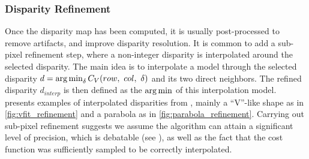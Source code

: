 \subsubsection{Disparity Refinement}\label{sec:postprocess_disparity}
Once the disparity map has been computed, it is usually post-processed to remove artifacts, and improve disparity resolution. It is common to add a sub-pixel refinement step, where a non-integer disparity is interpolated around the selected disparity. The main idea is to interpolate a model through the selected disparity $d=\operatorname*{arg\,min}_\delta C_V(row, ~col, ~\delta)$ and its two direct neighbors. The refined disparity $d_{interp}$ is then defined as the $\operatorname*{arg\,min}$ of this interpolation model.  presents examples of interpolated disparities from  \cite{haller_real-time_2010}, mainly a ``V''-like shape as in \ref{fig:vfit_refinement} and a parabola as in \ref{fig:parabola_refinement}. Carrying out sub-pixel refinement suggests we assume the algorithm can attain a significant level of precision, which is debatable (see ), as well as the fact that the cost function was sufficiently sampled to be correctly interpolated.

